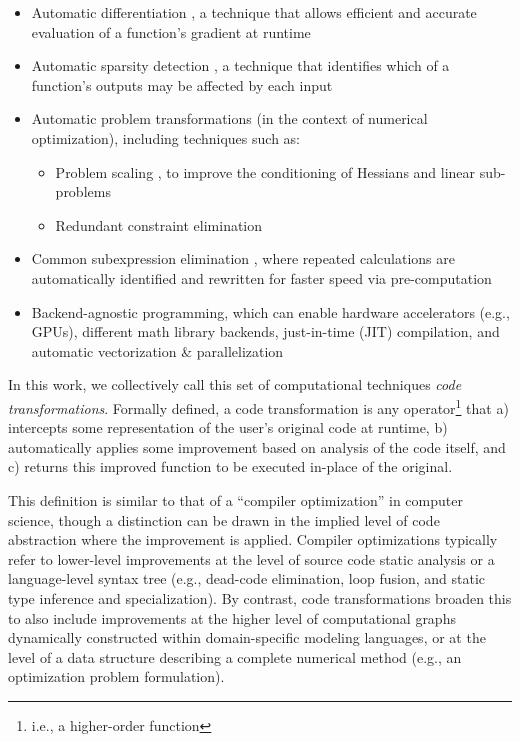 \begin{itemize}[noitemsep]
    \item Automatic differentiation \cite{griewank_automatic_1988}, a technique that allows efficient and accurate evaluation of a function's gradient at runtime
    \item Automatic sparsity detection \cite{gebremedhin_efficient_2009}, a technique that identifies which of a function's outputs may be affected by each input
    \item Automatic problem transformations (in the context of numerical optimization), including techniques such as:
    \begin{itemize}[noitemsep]
        \item Problem scaling \cite{nocedal_numerical_2006}, to improve the conditioning of Hessians and linear sub-problems
        \item Redundant constraint elimination
    \end{itemize}
    \item Common subexpression elimination \cite{casadi}, where repeated calculations are automatically identified and rewritten for faster speed via pre-computation
    \item Backend-agnostic programming, which can enable hardware accelerators (e.g., GPUs), different math library backends, just-in-time (JIT) compilation, and automatic vectorization \& parallelization \cite{jax}
\end{itemize}

In this work, we collectively call this set of computational techniques \emph{code transformations}. Formally defined, a code transformation is any operator\footnote{i.e., a higher-order function} that a) intercepts some representation of the user's original code at runtime, b) automatically applies some improvement based on analysis of the code itself, and c) returns this improved function to be executed in-place of the original.

This definition is similar to that of a ``compiler optimization'' in computer science, though a distinction can be drawn in the implied level of code abstraction where the improvement is applied. Compiler optimizations typically refer to lower-level improvements at the level of source code static analysis or a language-level syntax tree (e.g., dead-code elimination, loop fusion, and static type inference and specialization). By contrast, code transformations broaden this to also include improvements at the higher level of computational graphs dynamically constructed within domain-specific modeling languages, or at the level of a data structure describing a complete numerical method (e.g., an optimization problem formulation).

